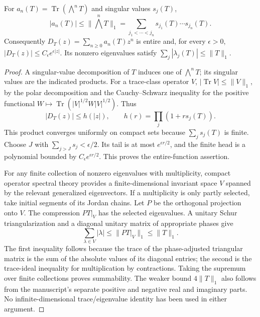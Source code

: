 \begin{lemma}
\label{geo-H-bounds}
For $a_n(T)=\operatorname{Tr}(\bigwedge^nT)$ and singular values $s_j(T)$,
\[
 |a_n(T)|\leq\|\bigwedge^nT\|_1
   =\sum_{j_1<\cdots<j_n}s_{j_1}(T)\cdots s_{j_n}(T).
\]
Consequently $D_T(z)=\sum_{n\geq0}a_n(T)z^n$ is entire and, for every
$\epsilon>0$, $|D_T(z)|\leq C_\epsilon e^{\epsilon|z|}$. Its nonzero
eigenvalues satisfy $\sum_j|\lambda_j(T)|\leq\|T\|_1$.
\end{lemma}
\begin{proof}
A singular-value decomposition of $T$ induces one of $\bigwedge^nT$; its
singular values are the indicated products. For a trace-class operator $V$,
$|\operatorname{Tr}V|\leq\|V\|_1$, by the polar decomposition and the
Cauchy--Schwarz inequality for the positive functional
$W\mapsto\operatorname{Tr}(|V|^{1/2}W|V|^{1/2})$. Thus
\[
 |D_T(z)|\leq h(|z|),\qquad h(r)=\prod_j(1+rs_j(T)).
\]
This product converges uniformly on compact sets because $\sum_js_j(T)$ is
finite. Choose $J$ with $\sum_{j>J}s_j<\epsilon/2$. Its tail is at most
$e^{\epsilon r/2}$, and the finite head is a polynomial bounded by
$C_\epsilon e^{\epsilon r/2}$. This proves the entire-function assertion.

For any finite collection of nonzero eigenvalues with multiplicity, compact
operator spectral theory provides a finite-dimensional invariant space $V$
spanned by the relevant generalized eigenvectors. If a multiplicity is only
partly selected, take initial segments of its Jordan chains. Let $P$ be the
orthogonal projection onto $V$. The compression $PT|_V$ has the selected
eigenvalues. A unitary Schur triangularization and a diagonal unitary matrix
of appropriate phases give
\[
 \sum_{\lambda\in V}|\lambda|
 \leq\|PT|_V\|_1\leq\|T\|_1.
\]
The first inequality follows because the trace of the phase-adjusted triangular
matrix is the sum of the absolute values of its diagonal entries; the second
is the trace-ideal inequality for multiplication by contractions. Taking the
supremum over finite collections proves summability. The weaker bound
$4\|T\|_1$ also follows from the manuscript's separate positive and negative
real and imaginary parts. No infinite-dimensional trace/eigenvalue identity
has been used in either argument.
\end{proof}

